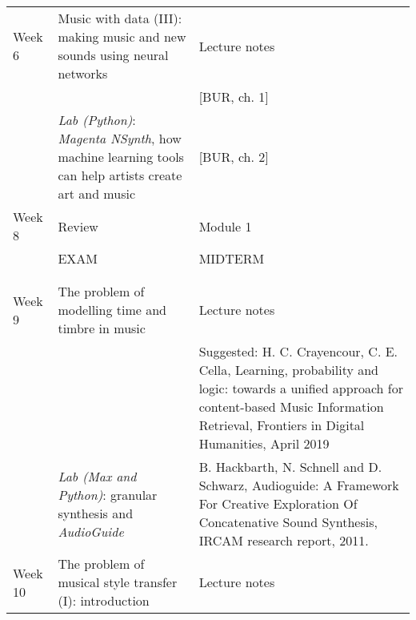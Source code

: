 \documentclass[letterpaper]{inzane_syllabus} %
\begin{document}
\begin{center}
\begin{tabularx}{\textwidth}{p{2cm}p{8cm} @{\hskip 0.5cm} p{9.5cm}}
Week 6 & Music with data (III): making music and new sounds using neural networks & Lecture notes \\
& & [BUR, ch. 1]\\

& \emph{Lab (Python)}: \emph{Magenta NSynth}, how machine learning tools can help artists create art and music & [BUR, ch. 2] \\
\arrayrulecolor{maingray}\hline

 Week 8 & Review & Module 1 \\
 &EXAM &  MIDTERM \\
& & \\ 
 \arrayrulecolor{myCOLOR}\hline
\multicolumn{2}{l}{\textbf{\textcolor{myCOLOR}{\large MODULE 2: Problems }}} \\
\hline

Week 9 & The problem of modelling time and timbre in music &  Lecture notes \\
& &  Suggested: H. C. Crayencour, C. E. Cella, Learning, probability and logic: towards a unified approach for content-based Music Information Retrieval, Frontiers in Digital Humanities, April 2019 \\



& \emph{Lab (Max and Python)}: granular synthesis and \emph{AudioGuide} & B. Hackbarth, N. Schnell and D. Schwarz, Audioguide: A Framework For Creative Exploration Of Concatenative Sound Synthesis, IRCAM research report, 2011. \\

\arrayrulecolor{maingray}\hline

Week 10 & The problem of musical style transfer (I): introduction & Lecture notes \\



\end{tabularx}
\end{center}
\end{document}
